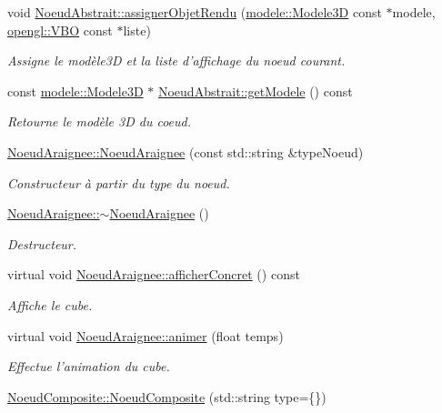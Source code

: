 \begin{DoxyCompactItemize}
void \hyperlink{group__inf2990_ga1f533acce98fbad7fa82758ccaea55ff}{Noeud\-Abstrait\-::assigner\-Objet\-Rendu} (\hyperlink{classmodele_1_1_modele3_d}{modele\-::\-Modele3\-D} const $\ast$modele, \hyperlink{classopengl_1_1_v_b_o}{opengl\-::\-V\-B\-O} const $\ast$liste)
\begin{DoxyCompactList}\small\item\em Assigne le modèle3\-D et la liste d'affichage du noeud courant. \end{DoxyCompactList}\item 
\hypertarget{group__inf2990_ga93e3a8fcc7fc1c325ee8c41c28714a1a}{const \hyperlink{classmodele_1_1_modele3_d}{modele\-::\-Modele3\-D} $\ast$ \hyperlink{group__inf2990_ga93e3a8fcc7fc1c325ee8c41c28714a1a}{Noeud\-Abstrait\-::get\-Modele} () const }\label{group__inf2990_ga93e3a8fcc7fc1c325ee8c41c28714a1a}

\begin{DoxyCompactList}\small\item\em Retourne le modèle 3\-D du coeud. \end{DoxyCompactList}\item 
\hyperlink{group__inf2990_ga0ca3d14d5baf9c6879ac53918cc54ba5}{Noeud\-Araignee\-::\-Noeud\-Araignee} (const std\-::string \&type\-Noeud)
\begin{DoxyCompactList}\small\item\em Constructeur à partir du type du noeud. \end{DoxyCompactList}\item 
\hyperlink{group__inf2990_ga78bf0250c601da26edb8cd8f2cddec10}{Noeud\-Araignee\-::$\sim$\-Noeud\-Araignee} ()
\begin{DoxyCompactList}\small\item\em Destructeur. \end{DoxyCompactList}\item 
virtual void \hyperlink{group__inf2990_ga4f9e7fbb424a0cb18e01ab12a092fc02}{Noeud\-Araignee\-::afficher\-Concret} () const 
\begin{DoxyCompactList}\small\item\em Affiche le cube. \end{DoxyCompactList}\item 
\hypertarget{group__inf2990_gae3f4c490330d597a18975014c06a05ca}{virtual void \hyperlink{group__inf2990_gae3f4c490330d597a18975014c06a05ca}{Noeud\-Araignee\-::animer} (float temps)}\label{group__inf2990_gae3f4c490330d597a18975014c06a05ca}

\begin{DoxyCompactList}\small\item\em Effectue l'animation du cube. \end{DoxyCompactList}\item 
\hypertarget{group__inf2990_ga9493824e1865121cb75097a28132573b}{\hyperlink{group__inf2990_ga9493824e1865121cb75097a28132573b}{Noeud\-Composite\-::\-Noeud\-Composite} (std\-::string type=\{\})}\label{group__inf2990_ga9493824e1865121cb75097a28132573b}


\end{DoxyCompactItemize}
